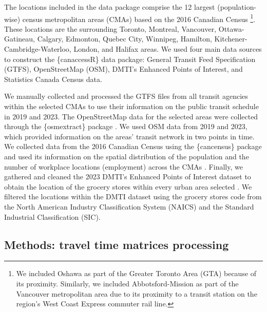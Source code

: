 \documentclass[Royal,times,sageh]{sagej}
\begin{document}
The locations included in the data package comprise the 12 largest
(population-wise) census metropolitan areas (CMAs) based on the 2016
Canadian Census \citep{governmentofcanada2016CensusPopulation2016}
\footnote{We included Oshawa as part of the Greater Toronto Area (GTA)
  because of its proximity. Similarly, we included Abbotsford-Mission as
  part of the Vancouver metropolitan area due to its proximity to a
  transit station on the region's West Coast Express commuter rail line.}.
These locations are the surrounding Toronto, Montreal, Vancouver,
Ottawa-Gatineau, Calgary, Edmonton, Quebec City, Winnipeg, Hamilton,
Kitchener-Cambridge-Waterloo, London, and Halifax areas. We used four
main data sources to construct the \{canaccessR\} data package: General
Transit Feed Specification (GTFS), OpenStreetMap (OSM), DMTI's Enhanced
Points of Interest, and Statistics Canada Census data.

We manually collected and processed the GTFS files from all transit
agencies within the selected CMAs to use their information on the public
transit schedule in 2019 and 2023. The OpenStreetMap data for the
selected areas were collected through the \{osmextract\} package
\citep{gilardiOsmextractDownloadImport2025}. We used OSM data from 2019
and 2023, which provided information on the areas' transit network in
two points in time. We collected data from the 2016 Canadian Census
using the \{cancensus\} package
\citep{vonbergmannCancensusPackageAccess2022} and used its information
on the spatial distribution of the population and the number of
workplace locations (employment) across the CMAs
\citep{governmentofcanada2016CensusPopulation2016}. Finally, we gathered
and cleaned the 2023 DMTI's Enhanced Points of Interest dataset to
obtain the location of the grocery stores within every urban area
selected \citep{dmtispatialincEnhancedPointsInterest2015}. We filtered
the locations within the DMTI dataset using the grocery stores code from
the North American Industry Classification System (NAICS) and the
Standard Industrial Classification (SIC).

\subsection{Methods: travel time matrices
processing}\label{methods-travel-time-matrices-processing}
\end{document}
